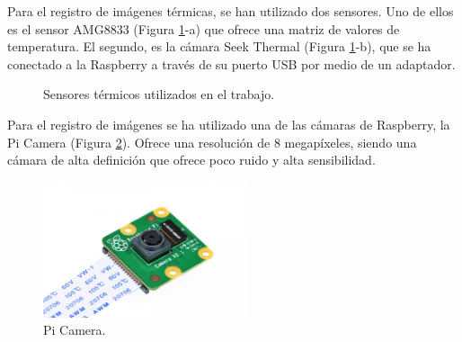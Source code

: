 Para el registro de imágenes térmicas, se han utilizado dos sensores. Uno de ellos es el sensor AMG8833 (Figura \ref{fig:termicos}-a) que ofrece una matriz de valores de temperatura. El segundo, es la cámara Seek Thermal (Figura \ref{fig:termicos}-b), que se ha conectado a la Raspberry a través de su puerto USB por medio de un adaptador.\\
\begin{figure}[h!]
  \begin{center}
    \hspace{2mm}
  \end{center}
\caption{Sensores térmicos utilizados en el trabajo.} \label{fig:termicos}
\end{figure}

Para el registro de imágenes se ha utilizado una de las cámaras de Raspberry, la Pi Camera (Figura \ref{fig:picam_of}). Ofrece una resolución de 8 megapíxeles, siendo una cámara de alta definición que ofrece poco ruido y alta sensibilidad.\\
\begin{figure} [h!]
  \begin{center}
    \includegraphics[width=6cm]{figs/picam_of}
  \end{center}
  \caption{Pi Camera.}
  \label{fig:picam_of}
\end{figure}

